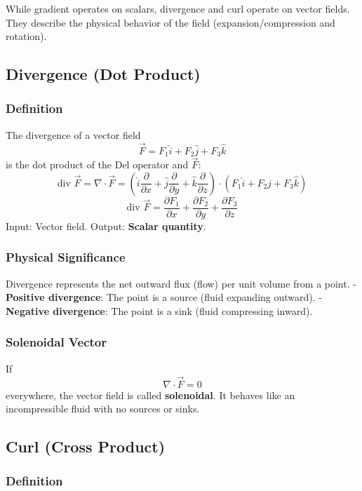 \documentclass[
]{article}
\begin{document}
While gradient operates on scalars, divergence and curl operate on
vector fields. They describe the physical behavior of the field
(expansion/compression and rotation).

\subsection{Divergence (Dot Product)}\label{divergence-dot-product}

\subsubsection{Definition}\label{definition-2}

The divergence of a vector field
\[
\vec{F} = F_1\hat{i} + F_2\hat{j} + F_3\hat{k}
\]
is the dot product of the Del operator and \(\vec{F}\):
\[
\text{div }\vec{F} = \nabla \cdot \vec{F} = \left(\hat{i}\frac{\partial}{\partial x} + \hat{j}\frac{\partial}{\partial y} + \hat{k}\frac{\partial}{\partial z}\right) \cdot (F_1\hat{i} + F_2\hat{j} + F_3\hat{k})
\]
\[
\text{div }\vec{F} = \frac{\partial F_1}{\partial x} + \frac{\partial F_2}{\partial y} + \frac{\partial F_3}{\partial z}
\]
Input: Vector field. Output: \textbf{Scalar quantity}.

\subsubsection{Physical Significance}\label{physical-significance}

Divergence represents the net outward flux (flow) per unit volume from a
point. - \textbf{Positive divergence}: The point is a source (fluid
expanding outward). - \textbf{Negative divergence}: The point is a sink
(fluid compressing inward).

\subsubsection{Solenoidal Vector}\label{solenoidal-vector}

If
\[
\nabla \cdot \vec{F} = 0
\]
everywhere, the vector field is called \textbf{solenoidal}. It behaves
like an incompressible fluid with no sources or sinks.

\subsection{Curl (Cross Product)}\label{curl-cross-product}

\subsubsection{Definition}\label{definition-3}
\end{document}
